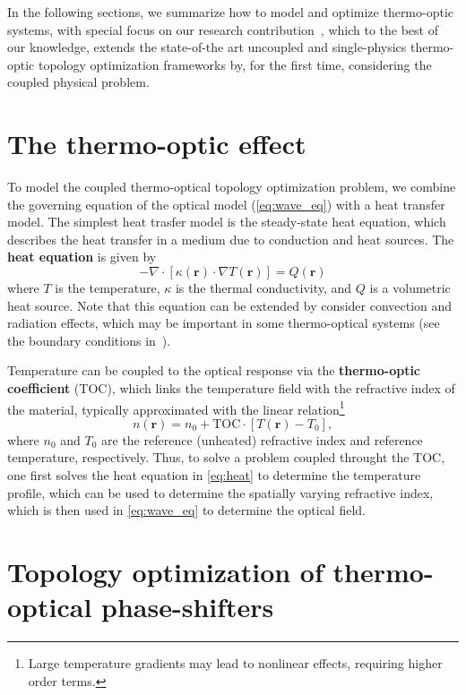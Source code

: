 In the following sections, we summarize how to model and optimize thermo-optic systems, 
with special focus on our research contribution~\cite{ownpub0}, which to the best of our knowledge,
extends the state-of-the art uncoupled and single-physics thermo-optic topology optimization frameworks by, for the first time, considering 
the coupled physical problem.

\section{The thermo-optic effect}

To model the coupled thermo-optical topology optimization problem, we combine the governing equation of the optical model (\eqref{eq:wave_eq})
with a heat transfer model. The simplest heat trasfer model is the steady-state heat equation, which describes the
heat transfer in a medium due to conduction and heat sources. The \textbf{heat equation} is given by
\begin{equation}\label{eq:heat}
    -\nabla \cdot \left[ \kappa(\mathbf{r})\cdot \nabla T(\mathbf{r}) \right] = Q(\mathbf{r})
\end{equation}
where $T$ is the temperature, $\kappa$ is the thermal conductivity, and $Q$ is a volumetric heat source. Note that this equation can be
extended by consider convection and radiation effects, which may be important in some thermo-optical systems (see the boundary conditions
in~\cite{ownpub0}).

Temperature can be coupled to the optical response via the \textbf{thermo-optic coefficient} (TOC), which links the temperature field
with the refractive index of the material, typically approximated with the linear relation\footnote{Large temperature gradients may lead to nonlinear effects, requiring higher order terms.}
\begin{equation}
n(\mathbf{r}) = n_0 + \text{TOC} \cdot \left[T(\mathbf{r}) - T_0\right],
\end{equation}
where $n_0$ and $T_0$ are the reference (unheated) refractive index and reference temperature, respectively. Thus, to solve a problem coupled throught the TOC, one first solves the heat equation
in \eqref{eq:heat}
to determine the temperature profile, which can be used to determine
the spatially varying refractive index, which is then used in \eqref{eq:wave_eq} to determine the optical field.

\section{Topology optimization of thermo-optical phase-shifters~\cite{ownpub0}}\label{sec:TOPS}

